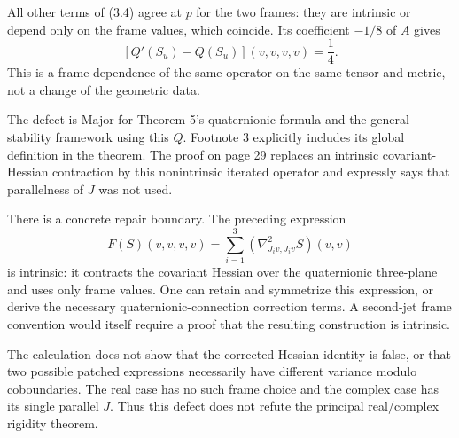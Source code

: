 \documentclass[10pt]{article}
\begin{document}
All other terms of (3.4) agree at \(p\) for the two frames: they are intrinsic or depend only on the frame values, which coincide. Its coefficient \(-1/8\) of \(A\) gives \[[Q'(S_u)-Q(S_u)](v,v,v,v)=\frac14.\] This is a frame dependence of the same operator on the same tensor and metric, not a change of the geometric data.\par
The defect is Major for Theorem 5’s quaternionic formula and the general stability framework using this \(Q\). Footnote 3 explicitly includes its global definition in the theorem. The proof on page 29 replaces an intrinsic covariant-Hessian contraction by this nonintrinsic iterated operator and expressly says that parallelness of \(J\) was not used.\par
There is a concrete repair boundary. The preceding expression \[F(S)(v,v,v,v)=
   \sum_{i=1}^3(\nabla^2_{J_i v,J_i v}S)(v,v)\] is intrinsic: it contracts the covariant Hessian over the quaternionic three-plane and uses only frame values. One can retain and symmetrize this expression, or derive the necessary quaternionic-connection correction terms. A second-jet frame convention would itself require a proof that the resulting construction is intrinsic.\par
The calculation does not show that the corrected Hessian identity is false, or that two possible patched expressions necessarily have different variance modulo coboundaries. The real case has no such frame choice and the complex case has its single parallel \(J\). Thus this defect does not refute the principal real/complex rigidity theorem.\par
\end{document}
